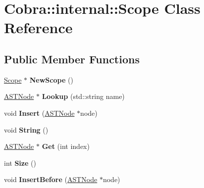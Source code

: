 \hypertarget{class_cobra_1_1internal_1_1_scope}{\section{Cobra\+:\+:internal\+:\+:Scope Class Reference}
\label{class_cobra_1_1internal_1_1_scope}
}
\subsection*{Public Member Functions}
\begin{DoxyCompactItemize}
\item 
\hypertarget{class_cobra_1_1internal_1_1_scope_a09b8ae8424fe6fd833fe543575872d1a}{\hyperlink{class_cobra_1_1internal_1_1_scope}{Scope} $\ast$ {\bfseries New\+Scope} ()}\label{class_cobra_1_1internal_1_1_scope_a09b8ae8424fe6fd833fe543575872d1a}

\item 
\hypertarget{class_cobra_1_1internal_1_1_scope_acfcc98102d21e2a5ecc20316be343b16}{\hyperlink{class_cobra_1_1internal_1_1_a_s_t_node}{A\+S\+T\+Node} $\ast$ {\bfseries Lookup} (std\+::string name)}\label{class_cobra_1_1internal_1_1_scope_acfcc98102d21e2a5ecc20316be343b16}

\item 
\hypertarget{class_cobra_1_1internal_1_1_scope_a9a3ba5f69a60e821246b2234d7648508}{void {\bfseries Insert} (\hyperlink{class_cobra_1_1internal_1_1_a_s_t_node}{A\+S\+T\+Node} $\ast$node)}\label{class_cobra_1_1internal_1_1_scope_a9a3ba5f69a60e821246b2234d7648508}

\item 
\hypertarget{class_cobra_1_1internal_1_1_scope_aaebe9d128689e9bf14661ee56cf23fa6}{void {\bfseries String} ()}\label{class_cobra_1_1internal_1_1_scope_aaebe9d128689e9bf14661ee56cf23fa6}

\item 
\hypertarget{class_cobra_1_1internal_1_1_scope_a3d2c6d4045bacad731303aabb2babfb1}{\hyperlink{class_cobra_1_1internal_1_1_a_s_t_node}{A\+S\+T\+Node} $\ast$ {\bfseries Get} (int index)}\label{class_cobra_1_1internal_1_1_scope_a3d2c6d4045bacad731303aabb2babfb1}

\item 
\hypertarget{class_cobra_1_1internal_1_1_scope_a8e08e196bd7915f62fdc826ecd040c75}{int {\bfseries Size} ()}\label{class_cobra_1_1internal_1_1_scope_a8e08e196bd7915f62fdc826ecd040c75}

\item 
\hypertarget{class_cobra_1_1internal_1_1_scope_a34919fe65b37babd08d32855f7498193}{void {\bfseries Insert\+Before} (\hyperlink{class_cobra_1_1internal_1_1_a_s_t_node}{A\+S\+T\+Node} $\ast$node)}\label{class_cobra_1_1internal_1_1_scope_a34919fe65b37babd08d32855f7498193}

\end{DoxyCompactItemize}
